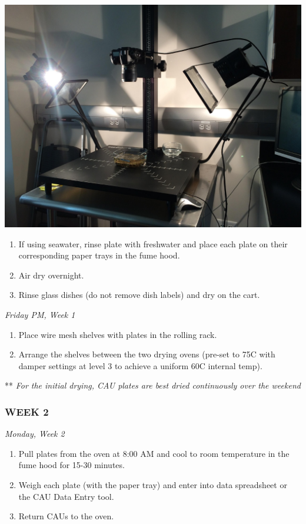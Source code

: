 \documentclass[
]{book}
\providecommand{\tightlist}{%
  \setlength{\itemsep}{0pt}\setlength{\parskip}{0pt}}
\begin{document}
\includegraphics{images/Camera9.jpg}

\begin{enumerate}
\def\labelenumi{\arabic{enumi}.}
\setcounter{enumi}{2}
\tightlist
\item
  If using seawater, rinse plate with freshwater and place each plate on their corresponding paper trays in the fume hood.
\item
  Air dry overnight.
\item
  Rinse glass dishes (do not remove dish labels) and dry on the cart.
\end{enumerate}

\emph{Friday PM, Week 1}

\begin{enumerate}
\def\labelenumi{\arabic{enumi}.}
\tightlist
\item
  Place wire mesh shelves with plates in the rolling rack.
\item
  Arrange the shelves between the two drying ovens (pre-set to 75C with damper settings at level 3 to achieve a uniform 60C internal temp).
\end{enumerate}

** \emph{For the initial drying, CAU plates are best dried continuously over the weekend}

\hypertarget{week-2}{%
\subsubsection{WEEK 2}\label{week-2}}

\emph{Monday, Week 2}

\begin{enumerate}
\def\labelenumi{\arabic{enumi}.}
\tightlist
\item
  Pull plates from the oven at 8:00 AM and cool to room temperature in the fume hood for 15-30 minutes.
\item
  Weigh each plate (with the paper tray) and enter into data spreadsheet or the CAU Data Entry tool.
\item
  Return CAUs to the oven.
\end{enumerate}
\end{document}
